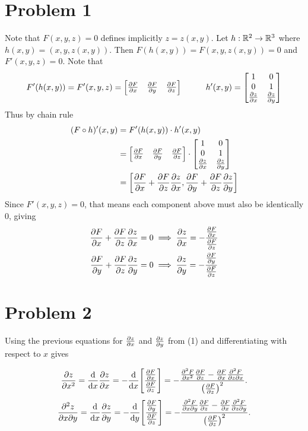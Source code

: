 \documentclass{eeleyes}
\begin{document}
\section*{Problem 1}
Note that $F(x,y,z) = 0$ defines implicitly $z = z(x,y)$. Let $h : \mathbb{R}^2 \to \mathbb{R}^3$ where $h(x,y) = (x,y, z(x,y))$. Then $F(h(x,y)) = F(x,y,z(x,y)) = 0$ and $F'(x,y,z) = 0$. Note that
\[
    F'(h(x,y)) = F'(x,y,z) = \mqty[\pdv{F}{x} & \pdv{F}{y} & \pdv{F}{z}] 
    \hspace{3em}
    h'(x,y) = \mqty[
        1 & 0 \\
        0 & 1 \\
        \pdv{z}{x} & \pdv{z}{y}
    ]
\]
Thus by chain rule
\begin{align*}
    (F \circ h)'(x,y) &= F'(h(x,y)) \cdot h'(x,y) \\
                      &= \mqty[\pdv{F}{x} & \pdv{F}{y} & \pdv{F}{z}] \cdot \mqty[
                            1 & 0 \\
                            0 & 1 \\
                            \pdv{z}{x} & \pdv{z}{y}
                         ] \\
                      &= \qty[\pdv{F}{x} + \pdv{F}{z} \pdv{z}{x}, \pdv{F}{y} + \pdv{F}{z} \pdv{z}{y}]
\end{align*}
Since $F'(x,y,z) = 0$, that means each component above must also be identically $0$, giving
\begin{align*}
    \pdv{F}{x} + \pdv{F}{z} \pdv{z}{x} = 0 &\implies \pdv{z}{x} = - \frac{\pdv{F}{x}}{\pdv{F}{z}} \\
    \pdv{F}{y} + \pdv{F}{z} \pdv{z}{y} = 0 &\implies \pdv{z}{y} = - \frac{\pdv{F}{y}}{\pdv{F}{z}} \\
\end{align*}

\section*{Problem 2}
Using the previous equations for $\pdv{z}{x}$ and $\pdv{z}{y}$ from (1) and differentiating with respect to $x$ gives

\[
    \pdv{z}{x^2} = \dv{x} \pdv{z}{x} = -\dv{x} \qty[\frac{\pdv{F}{x}}{\pdv{F}{z}}] = -\frac{\pdv[2]{F}{x} \pdv{F}{z} - \pdv{F}{x} \pdv{F}{z}{x}}{\qty(\pdv{F}{z})^2}
.\]
\[
    \pdv{z}{x}{y} = \dv{x} \pdv{z}{y} = -\dv{y} \qty[\frac{\pdv{F}{y}}{\pdv{F}{z}}] = -\frac{\pdv{F}{x}{y} \pdv{F}{z} - \pdv{F}{x} \pdv{F}{z}{y}}{\qty(\pdv{F}{z})^2}
.\]
\end{document}
